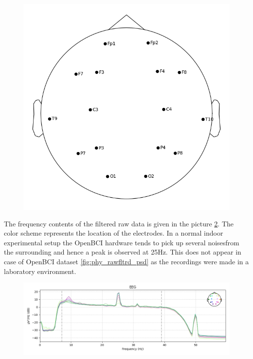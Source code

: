 \begin{figure}[h] 
    \begin{center}
    \includegraphics[height=0.6\textwidth]{images/obci_eegpose.png}
    \caption{}
    \label{fig:obci_eegpose}
\end{center}
\end{figure}


 The frequency contents of the filtered raw data is given in the picture \ref{fig:obci_rawfltrd_psd}. The color scheme represents the location of the electrodes. In a normal indoor experimental setup the OpenBCI hardware tends to pick up several noisesfrom the surrounding and hence a peak is observed at 25Hz. This does not appear in case of OpenBCI dataset \ref{fig:phy_rawfltrd_psd} as the recordings were made in a laboratory environment.

\begin{figure}[h] 
    \begin{center}
    \includegraphics[height=0.6\textwidth]{images/obci_rawfltrd_psd.png}
    \caption{}
    \label{fig:obci_rawfltrd_psd}
    \end{center}
\end{figure}

